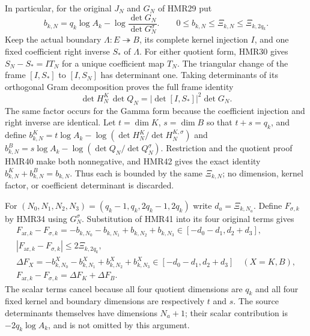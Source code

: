 In particular, for the original $J_N$ and $G_N$ of HMR29 put
\[
 b_{k,N}=q_k\log A_k-\log\frac{\det G_N}{\det G_N^\sigma}.
 \qquad 0\leq b_{k,N}\leq\Xi_{k,N}\leq\Xi_{k,2q_k}.
 \tag{HMR41}
\]
Keep the actual boundary $\Lambda:E\twoheadrightarrow B$,
its complete kernel injection $I$, and one fixed coefficient
right inverse $S_*$ of $\Lambda$. For either quotient form,
HMR30 gives $S_N-S_*=IT_N$ for a unique coefficient map $T_N$.
The triangular change of the frame $[I,S_*]$ to $[I,S_N]$
has determinant one. Taking determinants of its orthogonal
Gram decomposition proves the full frame identity
\[
 \det H_N^K\,\det Q_N
       =|\det[I,S_*]|^2\det G_N .
 \tag{HMR42}
\]
The same factor occurs for the Gamma form because the
coefficient injection and right inverse are identical.
Let $t=\dim K$, $s=\dim B$ so that $t+s=q_k$, and define
$b^K_{k,N}=t\log A_k-\log(\det H_N^K/\det H_N^{K,\sigma})$
and
$b^B_{k,N}=s\log A_k-\log(\det Q_N/\det Q_N^\sigma)$.
Restriction and the quotient proof HMR40 make both
nonnegative, and HMR42 gives the exact identity
$b^K_{k,N}+b^B_{k,N}=b_{k,N}$.
Thus each is bounded by the same $\Xi_{k,N}$; no dimension,
kernel factor, or coefficient determinant is discarded.

For $(N_0,N_1,N_2,N_3)=(q_k-1,q_k,2q_k-1,2q_k)$
write $d_a=\Xi_{k,N_a}$. Define $F_{\sigma,k}$ by HMR34
using $G_N^\sigma$. Substitution of HMR41 into its four
original terms gives
\[
\begin{gathered}
 F_{\mathrm{ar},k}-F_{\sigma,k}
       =-b_{k,N_0}-b_{k,N_1}+b_{k,N_2}+b_{k,N_3}
       \in[-d_0-d_1,d_2+d_3],\\
 |F_{\mathrm{ar},k}-F_{\sigma,k}|\leq2\Xi_{k,2q_k},\\
 \Delta F_X=-b^X_{k,N_0}-b^X_{k,N_1}
             +b^X_{k,N_2}+b^X_{k,N_3}
       \in[-d_0-d_1,d_2+d_3]\quad(X=K,B),\\
 F_{\mathrm{ar},k}-F_{\sigma,k}=\Delta F_K+\Delta F_B.
\end{gathered}\tag{HMR43}
\]
The scalar terms cancel because all four quotient dimensions
are $q_k$ and all four fixed kernel and boundary dimensions
are respectively $t$ and $s$. The source determinants themselves
have dimensions $N_a+1$; their scalar contribution is
$-2q_k\log A_k$, and is not omitted by this argument.

